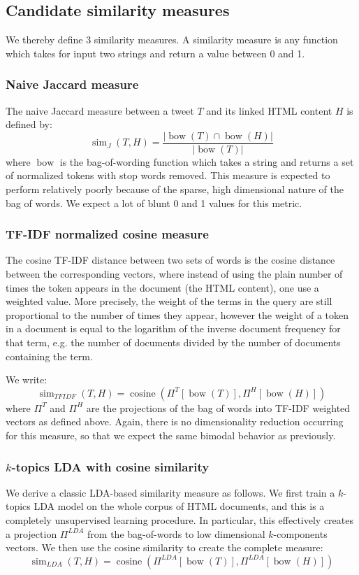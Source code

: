 \documentclass[times, 11pt, twocolumn]{article}
\DeclareMathOperator*{\bow}{bow}
\DeclareMathOperator*{\simil}{sim}
\DeclareMathOperator*{\cosine}{cosine}
\begin{document}
\subsection{Candidate similarity measures}
We thereby define 3 similarity measures. A similarity measure is any function which takes for input two strings and return a value between 0 and 1.

\subsubsection{Naive Jaccard measure}
The naive Jaccard measure between a tweet $T$ and its linked HTML content $H$ is defined by:
\[
	\simil_{J}(T, H) = \frac{|\bow(T) \cap \bow(H)|}{|\bow(T)|}
\]
where $\bow$ is the bag-of-wording function which takes a string and returns a set of normalized tokens with stop words removed. This measure is expected to perform relatively poorly because of the sparse, high dimensional nature of the bag of words. We expect a lot of blunt 0 and 1 values for this metric.

\subsubsection{TF-IDF normalized cosine measure}
The cosine TF-IDF distance between two sets of words is the cosine distance between 
the corresponding vectors, where instead of using the plain number of times the 
token appears in the document (the HTML content), one use a weighted value. 
More precisely, the weight of the terms in the query are still 
proportional to the number of times they appear, however the weight of a token
in a document is equal to the logarithm of the inverse document frequency for that
term, e.g. the number of documents divided by the number of documents containing
the term.

We write:
\[
	\simil_{TFIDF}(T, H) = \cosine (\Pi^{T}[\bow(T)], \Pi^{H}[\bow(H)])
\]
where $\Pi^T$ and $\Pi^H$ are the projections of the bag of words into TF-IDF
weighted vectors as defined above. Again, there is no dimensionality reduction 
occurring for this measure, so that we expect the same bimodal behavior as previously.

\subsubsection{$k$-topics LDA with cosine similarity}
We derive a classic LDA-based similarity measure as follows. We first train a $k$-topics LDA model
on the whole corpus of HTML documents, and this is a completely unsupervised learning procedure. 
In particular, this effectively creates a projection $\Pi^{LDA}$ from the bag-of-words to low 
dimensional $k$-components vectors. We then use the cosine similarity to create the complete measure:
\[
	\simil_{LDA}(T, H) = \cosine (\Pi^{LDA}[\bow(T)], \Pi^{LDA}[\bow(H)])
\]
\end{document}
